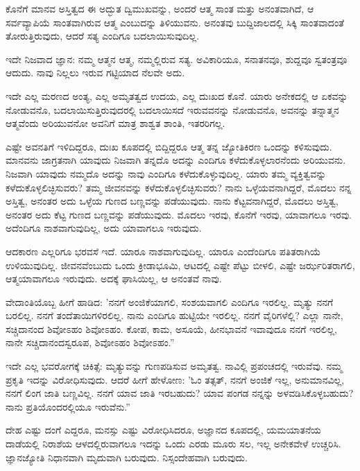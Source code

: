 ಕೊನೆಗೆ ಮಾನವ ಅಸ್ತಿತ್ವದ ಈ ಅದ್ಭುತ ದ್ವಿಮುಖವನ್ನು, ಅಂದರೆ ಆತ್ಮ ಸಾಂತ ಮತ್ತು ಅನಂತವಾಗಿದೆ, ಆ ಸರ್ವವ್ಯಾಪಿಯೆ ಸಾಂತವಾಗಿರುವ ಆತ್ಮ ಎಂಬುದನ್ನು ತಿಳಿಯುವನು. ಅನಂತವು ಬುದ್ದಿಜಾಲದಲ್ಲಿ ಸಿಕ್ಕಿ ಸಾಂತವಾದಂತೆ ತೋರುತ್ತಿರುವುದು, ಆದರೆ ಸತ್ಯ ಎಂದಿಗೂ ಬದಲಾಯಿಸುವುದಿಲ್ಲ.

ಇದೇ ನಿಜವಾದ ಜ್ಞಾನ: ನಮ್ಮ ಆತ್ಮನ ಆತ್ಮ, ನಮ್ಮಲ್ಲಿರುವ ಸತ್ಯ. ಅವಿಕಾರಿಯೂ, ಸನಾತನವೂ, ಶುದ್ದವೂ ಸ್ವತಂತ್ರವೂ ಆದುದು. ನಾವು ನಿಲ್ಲಲು ಇರುವ ಗಟ್ಟಿಯಾದ ನೆಲವೇ ಅದು.

ಇದೇ ಎಲ್ಲ ಮರಣದ ಅಂತ್ಯ, ಎಲ್ಲ ಅಮೃತತ್ವದ ಉದಯ, ಎಲ್ಲ ದುಃಖದ ಕೊನೆ. ಯಾರು ಅನೇಕದಲ್ಲಿ ಆ ಏಕವನ್ನು ನೋಡುವನೊ, ಬದಲಾಯಿಸುತ್ತಿರುವುದರಲ್ಲಿ ಬದಲಾಯಿಸದೆ ಇರುವವನನ್ನು ನೋಡುವನೊ, ಅವನನ್ನು ತನ್ನಾತ್ಮನ ಆತ್ಮವೆಂದು ಅರಿಯುವನೋ ಅವನಿಗೆ ಮಾತ್ರ ಶಾಶ್ವತ ಶಾಂತಿ, ಇತರರಿಗಲ್ಲ.

ಎಷ್ಟೇ ಅವನತಿಗೆ ಇಳಿದಿದ್ದರೂ, ದುಃಖ ಕೂಪದಲ್ಲಿ ಬಿದ್ದಿದ್ದರೂ ಆತ್ಮ ತನ್ನ ಜ್ಯೋತಿಕಿರಣ ಒಂದನ್ನು ಕಳಿಸುವುದು. ಮಾನವನು ಜಾಗ್ರತನಾಗಿ ಯಾವುದು ನಿಜವಾಗಿ ತನ್ನದೊ ಅದನ್ನು ಎಂದಿಗೂ ಕಳೆದುಕೊಳ್ಳಲಾರನೆಂದು ಅರಿಯುವನು. ನಿಜವಾಗಿ ಯಾವುದು ನಮ್ಮದೊ ಅದನ್ನು ನಾವು ಎಂದಿಗೂ ಕಳೆದುಕೊಳ್ಳುವುದಿಲ್ಲ. ಯಾರು ತಮ್ಮ ವ್ಯಕ್ತಿತ್ವವನ್ನು ಕಳೆದುಕೊಳ್ಳಲಿಚ್ಛಿಸುವರು? ತಮ್ಮ ಜೀವನವನ್ನು ಕಳೆದುಕೊಳ್ಳಲಿಚ್ಛಿಸುವರು? ನಾನು ಒಳ್ಳೆಯವನಾಗಿದ್ದರೆ, ಮೊದಲು ನನ್ನ ಅಸ್ತಿತ್ವ, ಅನಂತರ ಅದು ಒಳ್ಳೆಯ ಗುಣದ ಬಣ್ಣವನ್ನು ಪಡೆಯುವುದು. ನಾನು ಕೆಟ್ಟವನಾಗಿದ್ದರೆ, ಮೊದಲು ಅಸ್ತಿತ್ವ, ಅನಂತರ ಅದು ಕೆಟ್ಟ ಗುಣದ ಬಣ್ಣವನ್ನು ಪಡೆಯುವುದು. ಮೊದಲು ಇರವು, ಕೊನೆಗೆ ಇರವು, ಯಾವಾಗಲೂ ಇರವು. ಅದೆಂದಿಗೂ ನಾಶವಾಗುವುದಿಲ್ಲ, ಅದು ಯಾವಾಗಲೂ ಇರುವುದು.

ಆದಕಾರಣ ಎಲ್ಲರಿಗೂ ಭರವಸೆ ಇದೆ. ಯಾರೂ ನಾಶವಾಗುವುದಿಲ್ಲ. ಯಾರೂ ಎಂದೆಂದಿಗೂ ಪತಿತರಾಗಿಯೆ ಉಳಿಯುವುದಿಲ್ಲ. ಜೀವನವೆಂಬುದು ಒಂದು ಕ್ರೀಡಾಭೂಮಿ, ಆಟದಲ್ಲಿ ಎಷ್ಟೇ ಪೆಟ್ಟು ಬೀಳಲಿ, ಎಷ್ಟೇ ಜರ್ಝರಿತರಾಗಲಿ, ಆತ್ಮ\break ಯಾವಾಗಲೂ ಇರುವುದು. ಅದಕ್ಕೆ ಘಾಸಿಯಿಲ್ಲ, ಆ ಅನಂತವೆ ನಾವು.

ವೇದಾಂತಿಯೊಬ್ಬ ಹೀಗೆ ಹಾಡಿದ: 'ನನಗೆ ಅಂಜಿಕೆಯಾಗಲಿ, ಸಂಶಯವಾಗಲಿ ಎಂದಿಗೂ ಇರಲಿಲ್ಲ. ಮೃತ್ಯು ನನಗೆ ಬರಲಿಲ್ಲ. ನನಗೆ ತಂದೆತಾಯಿಗಳಿರಲಿಲ್ಲ. ನಾನು ಎಂದಿಗೂ ಹುಟ್ಟಿಯೇ ಇರಲಿಲ್ಲ. ನನಗೆ ವೈರಿಗಳೆಲ್ಲಿ? ಎಲ್ಲಾ ನಾನೇ, ಸಚ್ಚಿದಾನಂದ ಶಿವೋಽಹಂ ಶಿವೋಽಹಂ. ಕೋಪ, ಕಾಮ, ಅಸೂಯೆ, ಹೀನಭಾವನೆ ಇವಾವುದೂ ನನಗೆ ಇರಲಿಲ್ಲ, ನಾನೇ ಸಚ್ಚಿದಾನಂದಸ್ವರೂಪ, ಶಿವೋಽಹಂ ಶಿವೋಽಹಂ.''

ಇದೇ ಎಲ್ಲ ಭವರೋಗಕ್ಕೆ ಚಿಕಿತ್ಸೆ: ಮೃತ್ಯುವನ್ನು ಗುಣಪಡಿಸುವ ಅಮೃತತ್ವ. ನಾವಿಲ್ಲಿ ಪ್ರಪಂಚದಲ್ಲಿ ಇರುವೆವು. ನಮ್ಮ ಪ್ರಕೃತಿ ಇದನ್ನು ವಿರೋಧಿಸುವುದು. ಆದರೆ ಹೀಗೆ ಹೇಳೋಣ: 'ಓಂ ತತ್ಸತ್, ನನಗೆ ಅಂಜಿಕೆ ಇಲ್ಲ, ಅನುಮಾನವಿಲ್ಲ, ನನಗೆ ಲಿಂಗ ಜಾತಿ ಬಣ್ಣವಿಲ್ಲ. ನನಗೆ ಯಾವ ಜಾತಿ ಇರಬಹುದು? ಯಾವ ಪಂಗಡ ನನ್ನನ್ನು ಅಳವಡಿಸಿಕೊಳ್ಳಬಹುದು? ನಾನು ಪ್ರತಿಯೊಂದರಲ್ಲಿಯೂ ಇರುವೆನು.”

ದೇಹ ಎಷ್ಟು ದಂಗೆ ಎದ್ದರೂ, ಮನಸ್ಸು ಎಷ್ಟು ವಿರೋಧಿಸಿದರೂ, ಅಜ್ಞಾನದ ಕೂಪದಲ್ಲಿ, ಯಮಯಾತನೆಯ ದಾಡೆಯಲ್ಲಿ ನಿರಾಶೆಯ ಆಳದಲ್ಲಿರುವಾಗಲೂ ಇದನ್ನು ಒಂದು ಎರಡು ಮೂರು ಸಲ, ಇಲ್ಲ ಅನೇಕವೇಳೆ ಉಚ್ಚರಿಸಿ. ಜ್ಞಾನಜ್ಯೋತಿ ನಿಧಾನವಾಗಿ ಮೃದುವಾಗಿ ಬರುವುದು. ನಿಸ್ಸಂದೇಹವಾಗಿ ಬರುವುದು.

